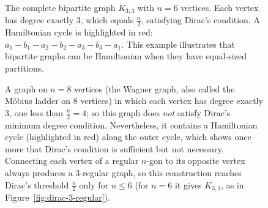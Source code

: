 \documentclass{article}
\theoremstyle{definition}
\begin{document}
\begin{figure}[h!]
\begin{center}
\end{center}
\caption{The complete bipartite graph $K_{3,3}$ with $n = 6$ vertices. Each vertex has degree exactly 3, which equals $\frac{n}{2}$, satisfying Dirac's condition. A Hamiltonian cycle is highlighted in red: $a_1 - b_1 - a_2 - b_2 - a_3 - b_3 - a_1$. This example illustrates that bipartite graphs can be Hamiltonian when they have equal-sized partitions.}
\label{fig:dirac-k33}
\end{figure}

\begin{figure}[h!]
\begin{center}
\end{center}
\caption{A graph on $n = 8$ vertices (the Wagner graph, also called the M\"obius ladder on 8 vertices) in which each vertex has degree exactly 3, one less than $\frac{n}{2} = 4$; so this graph does \emph{not} satisfy Dirac's minimum degree condition. Nevertheless, it contains a Hamiltonian cycle (highlighted in red) along the outer cycle, which shows once more that Dirac's condition is sufficient but not necessary. Connecting each vertex of a regular $n$-gon to its opposite vertex always produces a 3-regular graph, so this construction reaches Dirac's threshold $\frac{n}{2}$ only for $n \leq 6$ (for $n = 6$ it gives $K_{3,3}$, as in Figure~\ref{fig:dirac-3-regular}).}
\label{fig:wagner-graph}
\end{figure}
\end{document}
